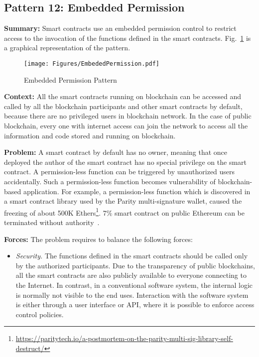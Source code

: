 
\subsection{ \textbf{Pattern 12: Embedded Permission}}
\label{sec:permission}

\noindent \textbf{Summary:} Smart contracts use an embedded permission control to restrict access to the invocation of the functions defined in the smart contracts. Fig.~\ref{fig:permission} is a graphical representation of the pattern.

\begin{figure}[t]
\begin{center}
\texttt{[image: Figures/EmbededPermission.pdf]}
\caption{Embedded Permission Pattern}\label{fig:permission}
\end{center}
\end{figure}


\vspace{0.5em}\noindent \textbf{Context:} 
All the smart contracts running on blockchain can be accessed and called by all the blockchain participants and other smart contracts by default, because there are no privileged users in blockchain network. In the case of public blockchain, every one with internet access can join the network to access all the information and code stored and running on blockchain. 

\vspace{0.5em}\noindent \textbf{Problem:} 
A smart contract by default has no owner, meaning that once deployed the author of the smart contract has no special privilege on the smart contract. A permission-less function can be triggered by unauthorized users accidentally. Such a permission-less function becomes vulnerability of blockchain-based application. For example, a permission-less function which is discovered in a smart contract library used by the Parity multi-signature wallet, caused the freezing of about 500K Ethers\footnote{\url{https://paritytech.io/a-postmortem-on-the-parity-multi-sig-library-self-destruct/}}. 7\% smart contract on public Ethereum can be terminated without authority~\cite{SRDS2017}.


\vspace{0.5em}\noindent \textbf{Forces:} The problem requires to balance the following forces:
\begin{itemize}
  \item \textit{Security.} The functions defined in the smart contracts should be called only by the authorized participants. Due to the transparency of public blockchains, all the smart contracts are also publicly available to everyone connecting to the Internet. In contrast, in a conventional software system, the internal logic is normally not visible to the end uses. Interaction with the software system is either through a user interface or API, where it is possible to enforce access control policies. 
\end{itemize}

